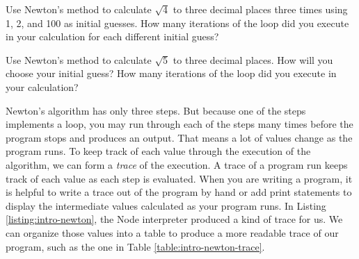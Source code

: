 \begin{question}
  Use Newton's method to calculate $\sqrt{4}$ to three decimal places three times using 1, 2, and 100 as initial guesses. How many iterations of the loop did you execute in your calculation for each different initial guess?
\end{question}

\begin{question}
  Use Newton's method to calculate $\sqrt{5}$ to three decimal places. How will you choose your initial guess? How many iterations of the loop did you execute in your calculation?
\end{question}


Newton's algorithm has only three steps. But because one of the steps implements a loop, you may run through each of the steps many times before the program stops and produces an output. That means a lot of values change as the program runs. To keep track of each value through the execution of the algorithm, we can form a \emph{trace} of the execution. A trace of a program run keeps track of each value as each step is evaluated. When you are writing a program, it is helpful to write a trace out of the program by hand or add print statements to display the intermediate values calculated as your program runs. In Listing \ref{listing:intro-newton}, the Node interpreter produced a kind of trace for us. We can organize those values into a table to produce a more readable trace of our program, such as the one in Table \ref{table:intro-newton-trace}.

